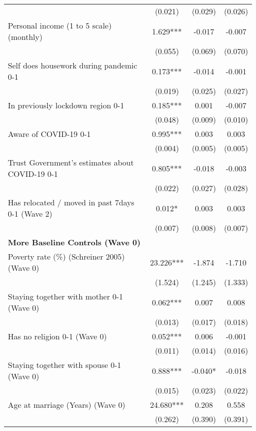 \begin{ThreePartTable}
\begin{table}[tbp]
\begin{tabular}{lccc}
                   &      (0.021)     &      (0.029)     &      (0.026)     \\ [0.1em] 
 Personal income (1 to 5 scale) (monthly) & 1.629*** & -0.017 & -0.007 \\ [0.1em] 
                   &      (0.055)     &      (0.069)     &      (0.070)     \\ [0.1em] 
 Self does housework during pandemic 0-1 & 0.173*** & -0.014 & -0.001 \\ [0.1em] 
                   &      (0.019)     &      (0.025)     &      (0.027)     \\ [0.1em] 
 In previously lockdown region 0-1 & 0.185*** & 0.001 & -0.007 \\ [0.1em] 
                   &      (0.048)     &      (0.009)     &      (0.010)     \\ [0.1em] 
 Aware of COVID-19 0-1 & 0.995*** & 0.003 & 0.003 \\ [0.1em] 
                   &      (0.004)     &      (0.005)     &      (0.005)     \\ [0.1em] 
 Trust Government's estimates about COVID-19 0-1 & 0.805*** & -0.018 & -0.003 \\ [0.1em] 
                   &      (0.022)     &      (0.027)     &      (0.028)     \\ [0.1em] 
 Has relocated / moved in past 7days 0-1 (Wave 2) & 0.012* & 0.003 & 0.003 \\ [0.1em] 
                   &      (0.007)     &      (0.008)     &      (0.007)     \\ [0.1em] 
\textbf{More Baseline Controls (Wave 0)} & & & \\ 
 Poverty rate (\%) (Schreiner 2005) (Wave 0) & 23.226*** & -1.874 & -1.710 \\ [0.1em] 
                   &      (1.524)     &      (1.245)     &      (1.333)     \\ [0.1em] 
 Staying together with mother 0-1 (Wave 0) & 0.062*** & 0.007 & 0.008 \\ [0.1em] 
                   &      (0.013)     &      (0.017)     &      (0.018)     \\ [0.1em] 
 Has no religion 0-1 (Wave 0) & 0.052*** & 0.006 & -0.001 \\ [0.1em] 
                   &      (0.011)     &      (0.014)     &      (0.016)     \\ [0.1em] 
 Staying together with spouse 0-1 (Wave 0) & 0.888*** & -0.040* & -0.018 \\ [0.1em] 
                   &      (0.015)     &      (0.023)     &      (0.022)     \\ [0.1em] 
 Age at marriage (Years) (Wave 0) & 24.680*** & 0.208 & 0.558 \\ [0.1em] 
                   &      (0.262)     &      (0.390)     &      (0.391)     \\ [0.1em] 
\hline\hline
\end{tabular}
\insertTableNotes
\end{table}
\end{ThreePartTable}
